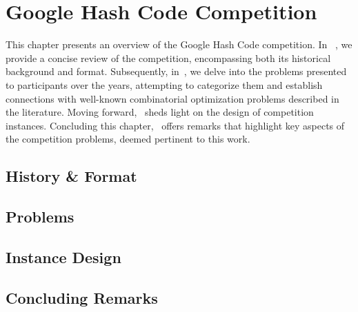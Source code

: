 \chapter{Google Hash Code Competition}
\label{ch:hashcode-problems}


This chapter presents an overview of the Google Hash Code competition. In
~, we provide a concise review of the competition,
encompassing both its historical background and format. Subsequently,
in~, we delve into the problems presented to
participants over the years, attempting to categorize them and establish
connections with well-known combinatorial optimization problems described in the
literature. Moving forward,~ sheds light on the
design of competition instances. Concluding this
chapter,~ offers remarks that highlight key aspects
of the competition problems, deemed pertinent to this work.

\section{History \& Format}
\label{sec:hashcode-format}


\section{Problems}
\label{sec:hashcode-problems}


\section{Instance Design}
\label{sec:hashcode-instance}


\section{Concluding Remarks}
\label{sec:hashcode-remarks}
